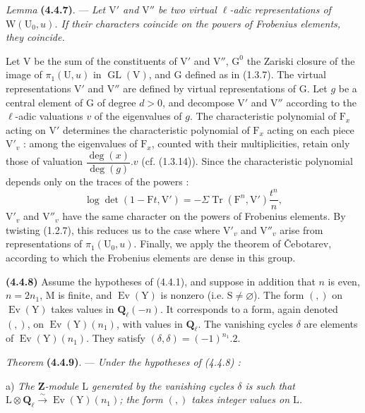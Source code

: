 \documentclass[11pt,leqno]{article}
\begin{document}
\textit{Lemma} \textbf{(4.4.7)}. — \textit{Let \(\mathrm{V}'\) and \(\mathrm{V}''\) be two virtual \(\ell\)-adic representations of \(\mathrm{W}(\mathrm{U}_0,u)\). If their characters coincide on the powers of Frobenius elements, they coincide.}

Let \(\mathrm{V}\) be the sum of the constituents of \(\mathrm{V}'\) and \(\mathrm{V}''\), \(\mathrm{G}^0\) the Zariski closure of the image of \(\pi_1(\mathrm{U},u)\) in \(\operatorname{GL}(\mathrm{V})\), and \(\mathrm{G}\) defined as in (1.3.7). The virtual representations \(\mathrm{V}'\) and \(\mathrm{V}''\) are defined by virtual representations of \(\mathrm{G}\). Let \(g\) be a central element of \(\mathrm{G}\) of degree \(d>0\), and decompose \(\mathrm{V}'\) and \(\mathrm{V}''\) according to the \(\ell\)-adic valuations \(v\) of the eigenvalues of \(g\). The characteristic polynomial of \(\mathrm{F}_x\) acting on \(\mathrm{V}'\) determines the characteristic polynomial of \(\mathrm{F}_x\) acting on each piece \(\mathrm{V}'_v\) : among the eigenvalues of \(\mathrm{F}_x\), counted with their multiplicities, retain only those of valuation \(\dfrac{\deg(x)}{\deg(g)}.v\) (cf. (1.3.14)). Since the characteristic polynomial depends only on the traces of the powers :
\[
\log\det(1-\mathrm{F}t,\mathrm{V}')
=-\Sigma\operatorname{Tr}(\mathrm{F}^n,\mathrm{V}')\frac{t^n}{n},
\]
\(\mathrm{V}'_v\) and \(\mathrm{V}''_v\) have the same character on the powers of Frobenius elements. By twisting (1.2.7), this reduces us to the case where \(\mathrm{V}'_v\) and \(\mathrm{V}''_v\) arise from representations of \(\pi_1(\mathrm{U}_0,u)\). Finally, we apply the theorem of \v{C}ebotarev, according to which the Frobenius elements are dense in this group.

\textbf{(4.4.8)} Assume the hypotheses of (4.4.1), and suppose in addition that \(n\) is even, \(n=2n_1\), \(\mathrm{M}\) is finite, and \(\operatorname{Ev}(\mathrm{Y})\) is nonzero (i.e. \(\mathrm{S}\neq\varnothing\)). The form \((,)\) on \(\operatorname{Ev}(\mathrm{Y})\) takes values in \(\mathbf{Q}_\ell(-n)\). It corresponds to a form, again denoted \((,)\), on \(\operatorname{Ev}(\mathrm{Y})(n_1)\), with values in \(\mathbf{Q}_\ell\). The vanishing cycles \(\delta\) are elements of \(\operatorname{Ev}(\mathrm{Y})(n_1)\). They satisfy \((\delta,\delta)=(-1)^{n_1}.2\).

\textit{Theorem} \textbf{(4.4.9)}. — \textit{Under the hypotheses of \textup{(4.4.8)} :}

a) \textit{The \(\mathbf{Z}\)-module \(\mathrm{L}\) generated by the vanishing cycles \(\delta\) is such that \(\mathrm{L}\otimes\mathbf{Q}_\ell\xrightarrow{\sim}\operatorname{Ev}(\mathrm{Y})(n_1)\); the form \((,)\) takes integer values on \(\mathrm{L}\).}
\end{document}
